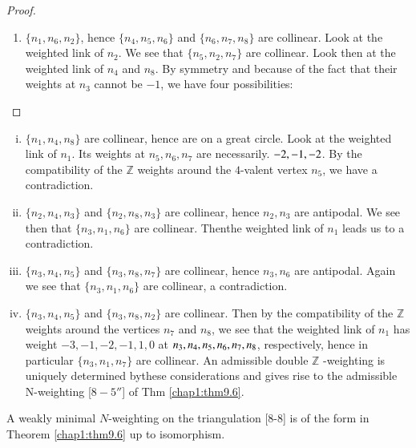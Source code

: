 \begin{proof}
\begin{enumerate}
\item $\{ n_1, n_6, n_2 \}$,  hence $\{ n_4, n_5, n_6 \}$ and $\{ n_6,
  n_7, n_8 \}$  are collinear. Look at the weighted link of $n_2$. We
  see that $\{ n_5, n_2, n_7 \}$ are collinear. Look then at the
  weighted link of $n_4$ and $n_8$. By symmetry and because of the
  fact that their weights at $n_3$ cannot be $-1$, we have four
  possibilities: 
\end{enumerate} 
\end{proof}

\begin{enumerate}[(i)]
\item $\{ n_1, n_4, n_8 \}$ are collinear, hence are on a great
  circle. Look at the weighted link of $n_1$. Its weights at $ n_5,
  n_6, n_7$ are necessarily. $-2,\break -1, -2$. By the compatibility of the
  $\mathbb{Z}$ weights around the $4$-valent vertex $n_5$, we have a
  contradiction. 

\item $\{ n_2, n_4, n_3 \}$ and $\{ n_2, n_8, n_3 \}$ are collinear,
  hence $n_2, n_3$ are antipodal. We see then that $\{ n_3, n_1, n_6
  \}$ are collinear. Then\pageoriginale the weighted link of $n_1$
  leads us to a contradiction.  

\item $\{ n_3, n_4, n_5 \}$ and $\{ n_3, n_8, n_7 \}$ are collinear,
  hence $n_3, n_6$ are antipodal. Again we see that $\{ n_3, n_1, n_6
  \}$ are collinear, a contradiction. 

\item $\{ n_3, n_4, n_5 \}$ and $\{ n_3, n_8, n_2 \}$ are collinear.
  Then by the compatibility of the $\mathbb{Z}$weights around the
  vertices $n_7$ and $n_8$, we see that the weighted link of $n_1$ has
  weight $-3, -1, -2, -1, 1, 0$ at $n_3, n_4, n_5, n_6,\break n_7, n_8$,
  respectively, hence in particular $\{ n_3, n_1, n_7 \}$ are
  collinear.  An admissible double $\mathbb{Z}$ -weighting is uniquely
  determined by\break these considerations and gives rise to the admissible
  N-weighting [$8-5''$] of Thm \ref{chap1:thm9.6}. 
\end{enumerate}

\begin{lemma}\label{chap1:lem9.15}
A weakly minimal $N$-weighting on the triangulation [8-8] is of the
form in Theorem \ref{chap1:thm9.6} up to isomorphism.  
\end{lemma}

